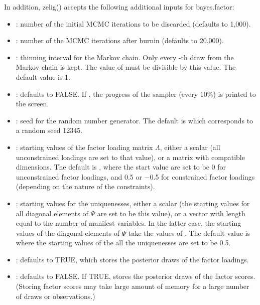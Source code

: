 \documentclass[letterpaper,10pt,english]{sphinxmanual}
\begin{document}
In addition, zelig() accepts the following additional inputs for
bayes.factor:
\begin{itemize}
\item {} 
: number of the initial MCMC iterations to be discarded
(defaults to 1,000).

\item {} 
: number of the MCMC iterations after burnin (defaults to
20,000).

\item {} 
: thinning interval for the Markov chain. Only every
-th draw from the Markov chain is kept. The value of 
must be divisible by this value. The default value is 1.

\item {} 
: defaults to FALSE. If , the progress of the
sampler (every \(10\%\)) is printed to the screen.

\item {} 
: seed for the random number generator. The default is 
which corresponds to a random seed 12345.

\item {} 
: starting values of the factor loading matrix
\(\Lambda\), either a scalar (all unconstrained loadings are set
to that value), or a matrix with compatible dimensions. The default
is , where the start value are set to be 0 for unconstrained
factor loadings, and 0.5 or \(-\)0.5 for constrained factor
loadings (depending on the nature of the constraints).

\item {} 
: starting values for the uniquenesses, either a scalar
(the starting values for all diagonal elements of \(\Psi\) are
set to be this value), or a vector with length equal to the number of
manifest variables. In the latter case, the starting values of the
diagonal elements of \(\Psi\) take the values of .
The default value is  where the starting values of the all the
uniquenesses are set to be 0.5.

\item {} 
: defaults to TRUE, which stores the posterior draws
of the factor loadings.

\item {} 
: defaults to FALSE. If TRUE, stores the posterior
draws of the factor scores. (Storing factor scores may take large
amount of memory for a large number of draws or observations.)

\end{itemize}
\end{document}
